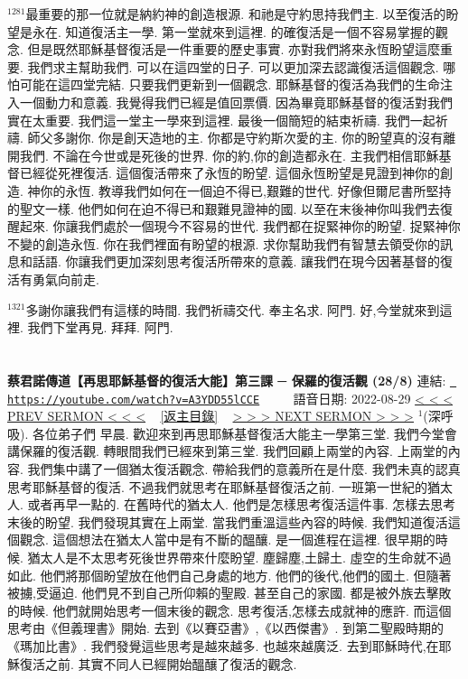 \documentclass{book}
\begin{document}
$^{1281}$最重要的那一位就是納約神的創造根源.
和祂是守約思持我們主.
以至復活的盼望是永在.
知道復活主一學.
第一堂就來到這裡.
的確復活是一個不容易掌握的觀念.
但是既然耶穌基督復活是一件重要的歷史事實.
亦對我們將來永恆盼望這麼重要.
我們求主幫助我們.
可以在這四堂的日子.
可以更加深去認識復活這個觀念.
哪怕可能在這四堂完結.
只要我們更新到一個觀念.
耶穌基督的復活為我們的生命注入一個動力和意義.
我覺得我們已經是值回票價.
因為畢竟耶穌基督的復活對我們實在太重要.
我們這一堂主一學來到這裡.
最後一個簡短的結束祈禱.
我們一起祈禱.
師父多謝你.
你是創天造地的主.
你都是守約斯次愛的主.
你的盼望真的沒有離開我們.
不論在今世或是死後的世界.
你的約,你的創造都永在.
主我們相信耶穌基督已經從死裡復活.
這個復活帶來了永恆的盼望.
這個永恆盼望是見證到神你的創造.
神你的永恆.
教導我們如何在一個迫不得已,艱難的世代.
好像但爾尼書所堅持的聖文一樣.
他們如何在迫不得已和艱難見證神的國.
以至在末後神你叫我們去復醒起來.
你讓我們處於一個現今不容易的世代.
我們都在捉緊神你的盼望.
捉緊神你不變的創造永恆.
你在我們裡面有盼望的根源.
求你幫助我們有智慧去領受你的訊息和話語.
你讓我們更加深刻思考復活所帶來的意義.
讓我們在現今因著基督的復活有勇氣向前走.

$^{1321}$多謝你讓我們有這樣的時間.
我們祈禱交代.
奉主名求.
阿門.
好,今堂就來到這裡.
我們下堂再見.
拜拜.
阿門.
\newpage



\section{}
\label{sec:A3YDD55lCCE}
\textbf{蔡君諾傳道【再思耶穌基督的復活大能】第三課 ─ 保羅的復活觀 (28/8)}
\newline
\newline
連結: \href{https://youtube.com/watch?v=A3YDD55lCCE}{\texttt{ https://youtube.com/watch?v=A3YDD55lCCE}} ~~~~ 語音日期: 2022-08-29 
\newline
\newline
\hyperref[sec:MrgiW6jGDH4]{\small{< < < PREV SERMON < < <}}
~
\hyperref[sec:index]{\small{[返主目錄]}}
~
\hyperref[sec:VcMUdsC37SI]{\small{> > > NEXT SERMON > > >}}
\newline
\newline
$^{1}$(深呼吸).
各位弟子們 早晨.
歡迎來到再思耶穌基督復活大能主一學第三堂.
我們今堂會講保羅的復活觀.
轉眼間我們已經來到第三堂.
我們回顧上兩堂的內容.
上兩堂的內容.
我們集中講了一個猶太復活觀念.
帶給我們的意義所在是什麼.
我們未真的認真思考耶穌基督的復活.
不過我們就思考在耶穌基督復活之前.
一班第一世紀的猶太人.
或者再早一點的.
在舊時代的猶太人.
他們是怎樣思考復活這件事.
怎樣去思考末後的盼望.
我們發現其實在上兩堂.
當我們重溫這些內容的時候.
我們知道復活這個觀念.
這個想法在猶太人當中是有不斷的醞釀.
是一個進程在這裡.
很早期的時候.
猶太人是不太思考死後世界帶來什麼盼望.
塵歸塵,土歸土.
虛空的生命就不過如此.
他們將那個盼望放在他們自己身處的地方.
他們的後代,他們的國土.
但隨著被擄,受逼迫.
他們見不到自己所仰賴的聖殿.
甚至自己的家國.
都是被外族去擊敗的時候.
他們就開始思考一個末後的觀念.
思考復活,怎樣去成就神的應許.
而這個思考由《但義理書》開始.
去到《以賽亞書》,《以西傑書》.
到第二聖殿時期的《瑪加比書》.
我們發覺這些思考是越來越多.
也越來越廣泛.
去到耶穌時代,在耶穌復活之前.
其實不同人已經開始醞釀了復活的觀念.
\end{document}
